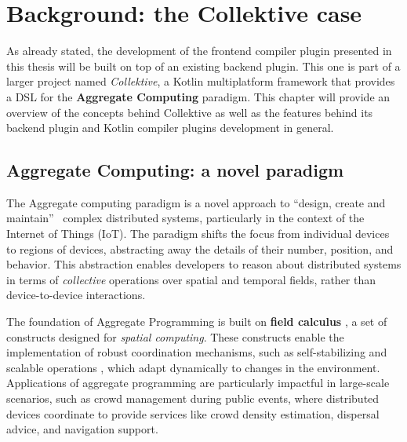 \documentclass[12pt,a4paper,openright,twoside]{book}
\begin{document}
\chapter{Background: the Collektive case}
\label{chap:background}

As already stated, the development of the frontend compiler plugin presented in
this thesis will be built on top of an existing backend plugin. This one is part
of a larger project named \emph{Collektive}, a Kotlin multiplatform framework
that provides a \ac{DSL} for the \textbf{Aggregate Computing}
\cite{DBLP:journals/computer/BealPV15} paradigm. This chapter will provide an
overview of the concepts behind Collektive as well as the features behind its
backend plugin and Kotlin compiler plugins development in general.

\section{Aggregate Computing: a novel paradigm}

The Aggregate computing paradigm is a novel approach to ``design, create and
maintain''~\cite{DBLP:journals/computer/BealPV15} complex distributed systems,
particularly in the context of the Internet of Things (IoT). The paradigm shifts
the focus from individual devices to regions of devices, abstracting away the
details of their number, position, and behavior. This abstraction enables
developers to reason about distributed systems in terms of \emph{collective}
operations over spatial and temporal fields, rather than device-to-device
interactions. 

The foundation of Aggregate Programming is built on \textbf{field calculus}
\cite{DBLP:journals/computer/BealPV15}, a set of constructs designed for
\emph{spatial computing}. These constructs enable the implementation of robust
coordination mechanisms, such as self-stabilizing and scalable operations
\cite{DBLP:journals/tomacs/ViroliABDP18}
\cite{DBLP:journals/jlap/ViroliBDACP19}, which adapt dynamically to changes in
the environment. Applications of aggregate programming are particularly
impactful in large-scale scenarios, such as crowd management during public
events, where distributed devices coordinate to provide services like crowd
density estimation, dispersal advice, and navigation support.
\end{document}
